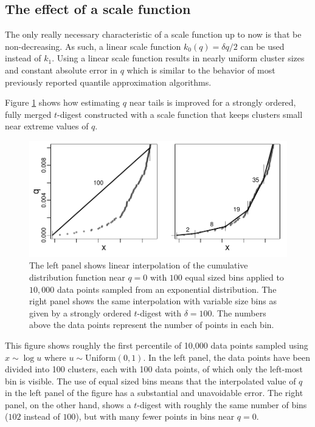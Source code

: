 \documentclass[]{statsoc}
\begin{document}
\subsection{The effect of a scale function}

The only really necessary characteristic of a scale function up to now is that be non-decreasing. As such,  a linear scale function $k_0(q) = \delta q/2$ can be used instead of  $k_1$. Using a linear scale function results in nearly uniform cluster sizes and constant absolute error in $q$  which is similar to the behavior of most previously reported quantile approximation algorithms. 

Figure \ref{fig:linear-interpolation} shows how  estimating $q$ near tails is improved for a strongly ordered, fully merged $t$-digest constructed with a scale function that keeps clusters small near extreme values of $q$. 
\begin{figure}[htb] %
   \centering
   \includegraphics[height=2.in, clip]{linear-interpolation.pdf} 
   \caption{The left panel shows linear interpolation of the cumulative distribution function near $q=0$ with $100$ equal sized bins applied to $10,000$ data points sampled from an exponential distribution. The right panel shows the same interpolation with variable size bins as given by a strongly ordered $t$-digest with $\delta=100$. The numbers above the data points represent the number of points in each bin. }
   \label{fig:linear-interpolation}
\end{figure}
This figure shows roughly the first percentile of 10,000 data points sampled using $x \sim \log u$ where $u \sim \mathrm{Uniform}(0,1)$. In the left panel, the data points have been divided into 100 clusters, each with 100 data points, of which only the left-most bin is visible. The use of equal sized bins means that the interpolated value of $q$ in the left panel of the figure has a substantial and unavoidable error. The right panel, on the other hand, shows a $t$-digest with roughly the same number of bins ($102$ instead of $100$), but with many fewer points in bins near  $q=0$. 
\end{document}
